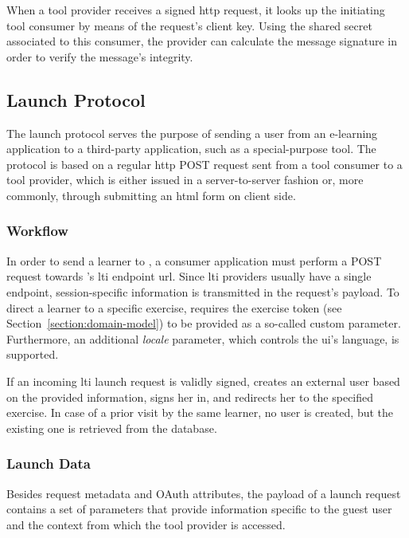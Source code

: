 When a tool provider receives a signed \gls{http} request, it looks up the initiating tool consumer by means of the request's client key. Using the shared secret associated to this consumer, the provider can calculate the message signature in order to verify the message's integrity.

\subsection{Launch Protocol}

The launch protocol serves the purpose of sending a user from an e-learning application to a third-party application, such as a special-purpose tool. The protocol is based on a regular \gls{http} POST request sent from a tool consumer to a tool provider, which is either issued in a server-to-server fashion or, more commonly, through submitting an \gls{html} form on client side.

\subsubsection{Workflow}

In order to send a learner to \tool, a consumer application must perform a POST request towards \tool's \gls{lti} endpoint \gls{url}. Since \gls{lti} providers usually have a single endpoint, session-specific information is transmitted in the request's payload. To direct a learner to a specific exercise, \tool requires the exercise token (see Section~\ref{section:domain-model}) to be provided as a so-called custom parameter. Furthermore, an additional \emph{locale} parameter, which controls the \gls{ui}'s language, is supported.

If an incoming \gls{lti} launch request is validly signed, \tool creates an external user based on the provided information, signs her in, and redirects her to the specified exercise. In case of a prior visit by the same learner, no user is created, but the existing one is retrieved from the database.

\subsubsection{Launch Data}

Besides request metadata and OAuth attributes, the payload of a launch request contains a set of parameters that provide information specific to the guest user and the context from which the tool provider is accessed.

